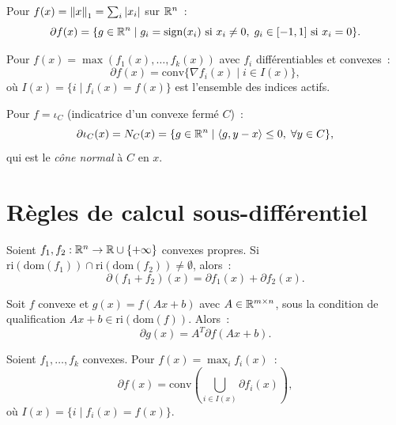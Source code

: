\begin{exemple}
Pour $f(x) = \left\| x \right\|_1 = \sum_i \left| x_i \right|$ sur $\mathbb{R}^n$~:
\[
    \partial f(x) = \{g \in \mathbb{R}^n \mid g_i = \mathrm{sign}(x_i) \text{ si } x_i \neq 0, \;
    g_i \in [-1,1] \text{ si } x_i = 0\}.
\]
\end{exemple}

\begin{exemple}
Pour $f(x) = \max(f_1(x), \ldots, f_k(x))$ avec $f_i$ diff\'erentiables et convexes~:
\[
    \partial f(x) = \mathrm{conv}\{\nabla f_i(x) \mid i \in I(x)\},
\]
o\`u $I(x) = \{i \mid f_i(x) = f(x)\}$ est l'ensemble des indices actifs.
\end{exemple}

\begin{exemple}
Pour $f = \iota_C$ (indicatrice d'un convexe ferm\'e $C$)~:
\[
    \partial \iota_C(x) = N_C(x) = \{g \in \mathbb{R}^n \mid \langle g, y-x \rangle \leq 0, \; \forall y \in C\},
\]
qui est le \emph{c\^one normal} \`a $C$ en $x$.
\end{exemple}

\section{R\`egles de calcul sous-diff\'erentiel}

\begin{theoreme}
\label{thm:somme_mr}
Soient $f_1, f_2 : \mathbb{R}^n \to \mathbb{R} \cup \{+\infty\}$ convexes propres. Si
$\mathrm{ri}(\mathrm{dom}(f_1)) \cap \mathrm{ri}(\mathrm{dom}(f_2)) \neq \emptyset$,
alors~:
\[
    \partial(f_1 + f_2)(x) = \partial f_1(x) + \partial f_2(x).
\]
\end{theoreme}

\begin{theoreme}
\label{thm:chaine}
Soit $f$ convexe et $g(x) = f(Ax + b)$ avec $A \in \mathbb{R}^{m \times n}$,
sous la condition de qualification $Ax + b \in \mathrm{ri}(\mathrm{dom}(f))$. Alors~:
\[
    \partial g(x) = A^T \partial f(Ax + b).
\]
\end{theoreme}

\begin{theoreme}
Soient $f_1, \ldots, f_k$ convexes. Pour $f(x) = \max_i f_i(x)$~:
\[
    \partial f(x) = \mathrm{conv}\left(\bigcup_{i \in I(x)} \partial f_i(x)\right),
\]
o\`u $I(x) = \{i \mid f_i(x) = f(x)\}$.
\end{theoreme}

